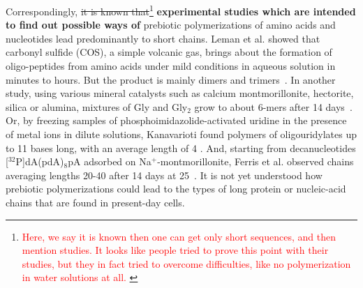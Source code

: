 \documentclass[journal=jacsat,manuscript=article,layout=twocolumn]{achemso}
\newcommand*{\red}[1]{\textcolor{red}{#1}}
\begin{document}
Correspondingly, 
\sout{it is known that}\footnote{\red{Here, we say it is known then one can get 
only short sequences, and then mention studies. It looks like people tried to prove this point with 
their studies, but they in fact tried to overcome difficulties, like no polymerization in water 
solutions at all. }} 
\textbf{experimental studies which are intended to find out possible ways of } 
prebiotic polymerizations of 
amino acids and nucleotides 
lead predominantly to short chains. Leman et al. 
showed that carbonyl sulfide (COS), a simple 
volcanic gas, brings about the formation of oligo-peptides from amino acids under mild conditions in 
aqueous solution in minutes to hours. But the product is mainly dimers and 
trimers~\cite{Leman2004a}.  In another study, using various mineral catalysts such as calcium 
montmorillonite, hectorite, silica or alumina, mixtures of Gly and Gly$_2$ grow to about 6-mers 
after 14 days~\cite{Rode1997,Rode1999}.  Or, by freezing samples of phosphoimidazolide-activated 
uridine in the presence of metal ions in dilute solutions, Kanavarioti found polymers of 
oligouridylates up to 11 bases long, with an average length of 4 \cite{Kanavarioti2001}.  And, 
starting from decanucleotides [$^{32}$P]dA(pdA)$_8$pA adsorbed on Na$^+$-montmorillonite, Ferris et 
al. observed chains averaging lengths 20-40 after 14 days at 25\textcelsius\ \cite{Ferris1996}.  It 
is not yet understood how prebiotic polymerizations could lead to the types of long protein or 
nucleic-acid chains that are found in present-day cells.



   
\end{document}
